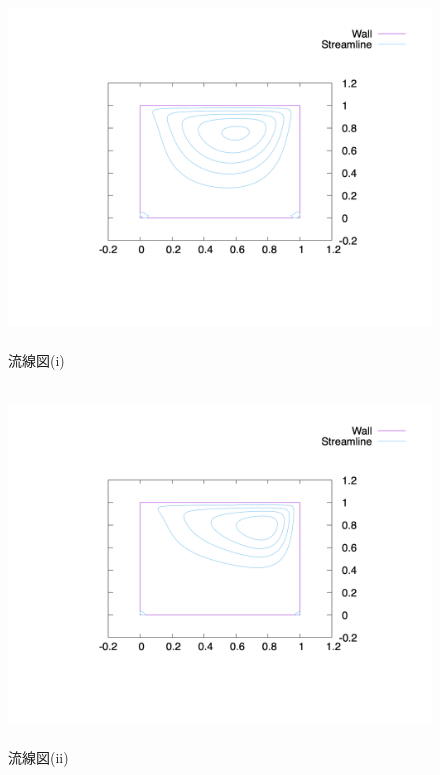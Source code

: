 \documentclass[upLaTeX,a4paper]{jsarticle}
\begin{document}
\begin{figure}[H]
  \centering
  \includegraphics[height=9.5cm]{outputs/img/stream_line_re50.png}
  \caption{流線図(i)}
  \label{fig:velocity_vector_re50}
\end{figure}
\begin{figure}[H]
  \centering
  \includegraphics[height=9.5cm]{outputs/img/stream_line_re200.png}
  \caption{流線図(ii)}
  \label{fig:velocity_vector_re200}
\end{figure}
\end{document}
